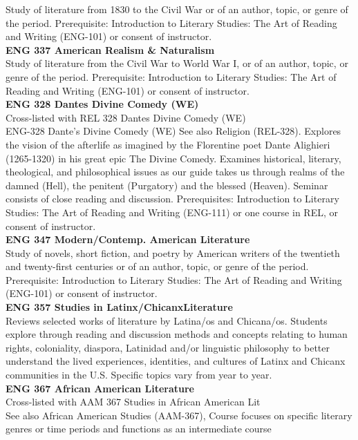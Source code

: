 \documentclass[
  letterpaper,
]{scrbook}
\begin{document}
Study of literature from 1830 to the Civil War or of an author, topic,
or genre of the period. Prerequisite: Introduction to Literary Studies:
The Art of Reading and Writing (ENG-101) or consent of instructor.\\
\textbf{ENG 337 American Realism \& Naturalism}\\
Study of literature from the Civil War to World War I, or of an author,
topic, or genre of the period. Prerequisite: Introduction to Literary
Studies: The Art of Reading and Writing (ENG-101) or consent of
instructor.\\
\textbf{ENG 328 Dantes Divine Comedy (WE)}\\
Cross-listed with REL 328 Dantes Divine Comedy (WE)\\
ENG-328 Dante's Divine Comedy (WE) See also Religion (REL-328). Explores
the vision of the afterlife as imagined by the Florentine poet Dante
Alighieri (1265-1320) in his great epic The Divine Comedy. Examines
historical, literary, theological, and philosophical issues as our guide
takes us through realms of the damned (Hell), the penitent (Purgatory)
and the blessed (Heaven). Seminar consists of close reading and
discussion. Prerequisites: Introduction to Literary Studies: The Art of
Reading and Writing (ENG-111) or one course in REL, or consent of
instructor.\\
\textbf{ENG 347 Modern/Contemp. American Literature}\\
Study of novels, short fiction, and poetry by American writers of the
twentieth and twenty-first centuries or of an author, topic, or genre of
the period. Prerequisite: Introduction to Literary Studies: The Art of
Reading and Writing (ENG-101) or consent of instructor.\\
\textbf{ENG 357 Studies in Latinx/ChicanxLiterature}\\
Reviews selected works of literature by Latina/os and Chicana/os.
Students explore through reading and discussion methods and concepts
relating to human rights, coloniality, diaspora, Latinidad and/or
linguistic philosophy to better understand the lived experiences,
identities, and cultures of Latinx and Chicanx communities in the U.S.
Specific topics vary from year to year.\\
\textbf{ENG 367 African American Literature}\\
Cross-listed with AAM 367 Studies in African American Lit\\
See also African American Studies (AAM-367), Course focuses on specific
literary genres or time periods and functions as an intermediate course
\end{document}
